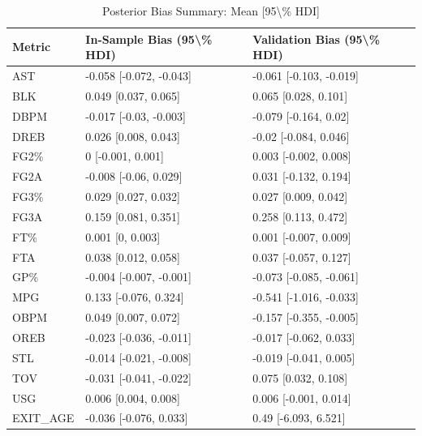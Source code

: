 \begin{table}[t]
\caption*{
{\fontsize{20}{25}\selectfont  Posterior Bias Summary: Mean [95\textbackslash{}\% HDI]\fontsize{12}{15}\selectfont }
} 
\fontsize{12.0pt}{14.0pt}\selectfont
\begin{tabular*}{\linewidth}{@{\extracolsep{\fill}}lll}
\toprule
Metric & In-Sample Bias (95\textbackslash{}\% HDI) & Validation Bias (95\textbackslash{}\% HDI) \\ 
\midrule\addlinespace[2.5pt]
AST & -0.058 [-0.072, -0.043] & -0.061 [-0.103, -0.019] \\ 
BLK & 0.049 [0.037, 0.065] & 0.065 [0.028, 0.101] \\ 
DBPM & -0.017 [-0.03, -0.003] & -0.079 [-0.164, 0.02] \\ 
DREB & 0.026 [0.008, 0.043] & -0.02 [-0.084, 0.046] \\ 
FG2\% & 0 [-0.001, 0.001] & 0.003 [-0.002, 0.008] \\ 
FG2A & -0.008 [-0.06, 0.029] & 0.031 [-0.132, 0.194] \\ 
FG3\% & 0.029 [0.027, 0.032] & 0.027 [0.009, 0.042] \\ 
FG3A & 0.159 [0.081, 0.351] & 0.258 [0.113, 0.472] \\ 
FT\% & 0.001 [0, 0.003] & 0.001 [-0.007, 0.009] \\ 
FTA & 0.038 [0.012, 0.058] & 0.037 [-0.057, 0.127] \\ 
GP\% & -0.004 [-0.007, -0.001] & -0.073 [-0.085, -0.061] \\ 
MPG & 0.133 [-0.076, 0.324] & -0.541 [-1.016, -0.033] \\ 
OBPM & 0.049 [0.007, 0.072] & -0.157 [-0.355, -0.005] \\ 
OREB & -0.023 [-0.036, -0.011] & -0.017 [-0.062, 0.033] \\ 
STL & -0.014 [-0.021, -0.008] & -0.019 [-0.041, 0.005] \\ 
TOV & -0.031 [-0.041, -0.022] & 0.075 [0.032, 0.108] \\ 
USG & 0.006 [0.004, 0.008] & 0.006 [-0.001, 0.014] \\ 
EXIT\_AGE & -0.036 [-0.076, 0.033] & 0.49 [-6.093, 6.521] \\ 
\bottomrule
\end{tabular*}
\end{table}

